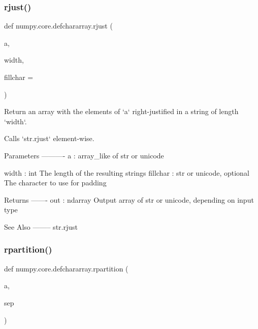 \subsubsection{\texorpdfstring{rjust()}{rjust()}}
{\footnotesize\ttfamily def numpy.\+core.\+defchararray.\+rjust (\begin{DoxyParamCaption}\item[{}]{a,  }\item[{}]{width,  }\item[{}]{fillchar = {\ttfamily \textquotesingle{}~\textquotesingle{}} }\end{DoxyParamCaption})}

\begin{DoxyVerb}Return an array with the elements of `a` right-justified in a
string of length `width`.

Calls `str.rjust` element-wise.

Parameters
----------
a : array_like of str or unicode

width : int
    The length of the resulting strings
fillchar : str or unicode, optional
    The character to use for padding

Returns
-------
out : ndarray
    Output array of str or unicode, depending on input type

See Also
--------
str.rjust\end{DoxyVerb}
 \mbox{\label{namespacenumpy_1_1core_1_1defchararray_a1a8c15b7c697eeb18a01fa9627882410}} 
\subsubsection{\texorpdfstring{rpartition()}{rpartition()}}
{\footnotesize\ttfamily def numpy.\+core.\+defchararray.\+rpartition (\begin{DoxyParamCaption}\item[{}]{a,  }\item[{}]{sep }\end{DoxyParamCaption})}

